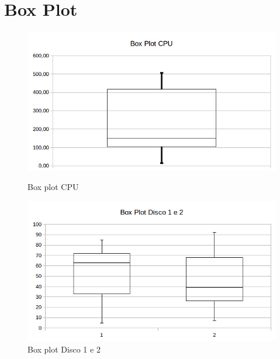 \documentclass[11pt,a4paper,openany,oneside]{abntex2}
\begin{document}


	
\section{\textbf{Box Plot}}
\label{qbboxp}
\begin{figure}[H]
	\begin{minipage}[b]{0.45\linewidth}
		\centering
		\includegraphics[width=\textwidth]{boxplotcpu.png}
		\caption{Box plot CPU}
		\label{fig:boxplotcpu}
	\end{minipage}
	\hspace{0.5cm}
	\begin{minipage}[b]{0.45\linewidth}
		\centering
		\includegraphics[width=\textwidth]{boxplotdiscos.png}
		\caption{Box plot Disco 1 e 2}
		\label{fig:boxplotd1d2}
					
	\end{minipage}
	
\end{figure}
	
\end{document}
